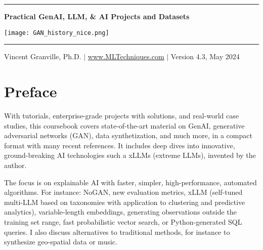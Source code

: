 \documentclass[oneside,10pt]{book}
\begin{document}
\hypersetup{linkcolor=blue}

\baselineskip
\thispagestyle{empty}
\hspace{0pt}
\vfill
\begin{center}
\rule{0.90\textwidth}{.4pt}
\end{center}

\begin{center}
{\Huge \bf{Practical GenAI, LLM, \& AI Projects and Datasets} }  
\end{center}


\baselineskip
\addvspace{2cm}
\begin{center}
\texttt{[image: GAN\_history\_nice.png]}  
\end{center}
\addvspace{2cm}
\begin{center}
\rule{0.90\textwidth}{.4pt}
\end{center}
\begin{center}
Vincent Granville, Ph.D. $|$ \href{https://mltechniques.com/}{www.MLTechniques.com} $|$ Version 4.3, May 2024 
\end{center}

\hypersetup{linkcolor=red} %

\vfill
\hspace{0pt}
\pagebreak

\chapter*{Preface} %

With tutorials, enterprise-grade projects with solutions, and real-world case studies, this coursebook covers state-of-the-art material on GenAI, generative adversarial networks (GAN), data synthetization, and much more, in a compact format with many recent references. It includes deep dives into innovative, ground-breaking AI technologies such a xLLMs (extreme LLMs), invented by the author. 

The focus is on explainable AI with faster, simpler, high-performance, automated algorithms. For instance: NoGAN, new evaluation metrics, xLLM (self-tuned multi-LLM based on taxonomies with application to clustering and predictive analytics), variable-length embeddings, generating observations outside the training set range, fast probabilistic vector search, or Python-generated SQL queries. I also discuss alternatives to traditional methods, for instance to synthesize geo-spatial data or music. 
\end{document}
